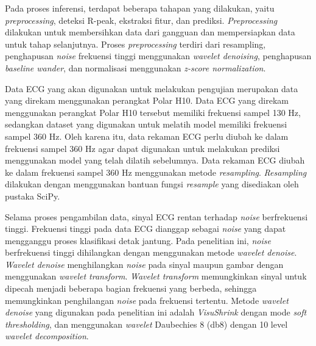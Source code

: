 Pada proses inferensi, terdapat beberapa tahapan yang dilakukan, yaitu \textit{preprocessing}, deteksi R-peak, ekstraksi fitur, dan prediksi.
\textit{Preprocessing} dilakukan untuk membersihkan data dari gangguan dan mempersiapkan data untuk tahap selanjutnya.
Proses \textit{preprocessing} terdiri dari resampling, penghapusan \textit{noise} frekuensi tinggi menggunakan \textit{wavelet denoising}, penghapusan \textit{baseline wander}, dan normalisasi menggunakan \textit{z-score normalization}.

Data ECG yang akan digunakan untuk melakukan pengujian merupakan data yang direkam menggunakan perangkat Polar H10.
Data ECG yang direkam menggunakan perangkat Polar H10 tersebut memiliki frekuensi sampel 130 Hz, sedangkan dataset yang digunakan untuk melatih model memiliki frekuensi sampel 360 Hz.
Oleh karena itu, data rekaman ECG perlu diubah ke dalam frekuensi sampel 360 Hz agar dapat digunakan untuk melakukan prediksi menggunakan model yang telah dilatih sebelumnya.
Data rekaman ECG diubah ke dalam frekuensi sampel 360 Hz menggunakan metode \textit{resampling}.
\textit{Resampling} dilakukan dengan menggunakan bantuan fungsi \textit{resample} yang disediakan oleh pustaka SciPy.


Selama proses pengambilan data, sinyal ECG rentan terhadap \textit{noise} berfrekuensi tinggi.
Frekuensi tinggi pada data ECG dianggap sebagai \textit{noise} yang dapat mengganggu proses klasifikasi detak jantung.
Pada penelitian ini, \textit{noise} berfrekuensi tinggi dihilangkan dengan menggunakan metode \textit{wavelet denoise}.
\textit{Wavelet denoise} menghilangkan \textit{noise} pada sinyal maupun gambar dengan menggunakan \textit{wavelet transform}.
\textit{Wavelet transform} memungkinkan sinyal untuk dipecah menjadi beberapa bagian frekuensi yang berbeda, sehingga memungkinkan penghilangan \textit{noise} pada frekuensi tertentu.
Metode \textit{wavelet denoise} yang digunakan pada penelitian ini adalah \textit{VisuShrink} dengan mode \textit{soft thresholding}, dan menggunakan \textit{wavelet} Daubechies 8 (db8) dengan 10 level \textit{wavelet decomposition}.

